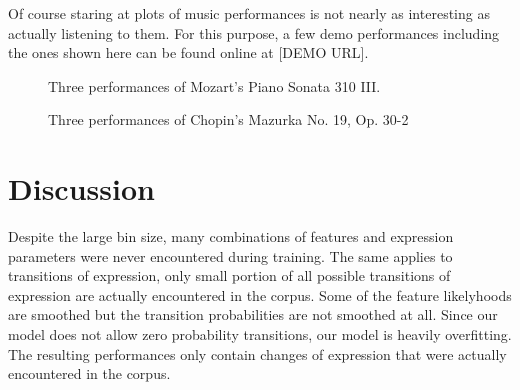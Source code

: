 \documentclass[a4paper,10pt]{article}
\begin{document}
Of course staring at plots of music performances is not nearly as interesting as actually listening to them. For this purpose, a few demo performances including the ones shown here can be found online at [DEMO URL].


\begin{figure}
\centering
{}
\caption{Three performances of Mozart's Piano Sonata 310 III.}
\label{fig:mozartperformances}
\end{figure}

\begin{figure}
\centering
{}
\caption{Three performances of Chopin's Mazurka No. 19, Op. 30-2}
\label{fig:chopinperformances}
\end{figure}



\section{Discussion}
\label{sec:discussion}


Despite the large bin size, many combinations of features and expression parameters were never encountered during training. The same applies to transitions of expression, only small portion of all possible transitions of expression are actually encountered in the corpus. Some of the feature likelyhoods are smoothed but the transition probabilities are not smoothed at all. Since our model does not allow zero probability transitions, our model is heavily overfitting. The resulting performances only contain changes of expression that were actually encountered in the corpus.
\end{document}
